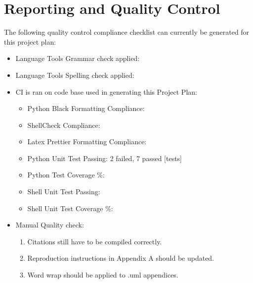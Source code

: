\chapter{Reporting and Quality Control}\label{chap:baseline_reporting_and_quality_control}
The following quality control compliance checklist can currently be generated for this project plan:

\begin{itemize}
	\item Language Tools Grammar check applied:\greencheck
	\item Language Tools Spelling check applied:\greencheck
	\item CI is ran on code base used in generating this Project Plan:\xmark
	\begin{itemize}
		\item Python Black Formatting Compliance:\xmark
		\item ShellCheck Compliance:\xmark
		\item Latex Prettier Formatting Compliance:\xmark
		\item Python Unit Test Passing: 2 failed, 7 passed [tests]
		\item Python Test Coverage \%:\xmark [\%]
		\item Shell Unit Test Passing:\xmark [tests]
		\item Shell Unit Test Coverage \%:\xmark [\%]
	\end{itemize}
	\item Manual Quality check:
	\begin{enumerate}
		\item Citations still have to be compiled correctly.
		\item Reproduction instructions in Appendix A should be updated.
		\item Word wrap should be applied to .uml appendices.
	\end{enumerate}
\end{itemize}